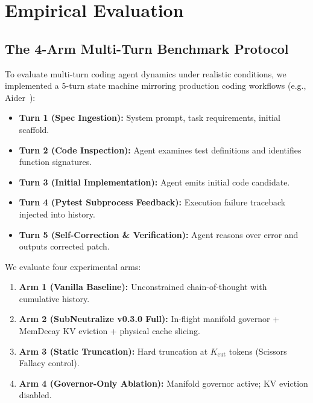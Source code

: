 \documentclass[10pt,twocolumn,letterpaper]{article}
\begin{document}
\section{Empirical Evaluation}

\subsection{The 4-Arm Multi-Turn Benchmark Protocol}
To evaluate multi-turn coding agent dynamics under realistic conditions, we implemented a 5-turn state machine mirroring production coding workflows (e.g., Aider~\cite{gauthier2024aider}):
\begin{itemize}
    \item \textbf{Turn 1 (Spec Ingestion):} System prompt, task requirements, initial scaffold.
    \item \textbf{Turn 2 (Code Inspection):} Agent examines test definitions and identifies function signatures.
    \item \textbf{Turn 3 (Initial Implementation):} Agent emits initial code candidate.
    \item \textbf{Turn 4 (Pytest Subprocess Feedback):} Execution failure traceback injected into history.
    \item \textbf{Turn 5 (Self-Correction \& Verification):} Agent reasons over error and outputs corrected patch.
\end{itemize}

We evaluate four experimental arms:
\begin{enumerate}
    \item \textbf{Arm 1 (Vanilla Baseline):} Unconstrained chain-of-thought with cumulative history.
    \item \textbf{Arm 2 (SubNeutralize v0.3.0 Full):} In-flight manifold governor + MemDecay KV eviction + physical cache slicing.
    \item \textbf{Arm 3 (Static Truncation):} Hard truncation at $K_{\text{cut}}$ tokens (Scissors Fallacy control).
    \item \textbf{Arm 4 (Governor-Only Ablation):} Manifold governor active; KV eviction disabled.
\end{enumerate}
\end{document}
